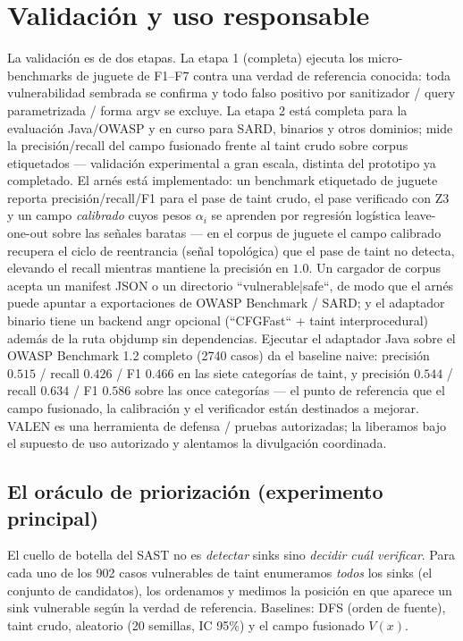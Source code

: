 \documentclass[11pt]{article}
\begin{document}
\section{Validación y uso responsable}
La validación es de dos etapas. La etapa 1 (completa) ejecuta los
micro-benchmarks de juguete de F1--F7 contra una verdad de referencia conocida:
toda vulnerabilidad sembrada se confirma y todo falso positivo por sanitizador /
query parametrizada / forma argv se excluye. La etapa 2 está completa para la evaluación Java/OWASP y en curso para SARD,
binarios y otros dominios; mide la precisión/recall del campo fusionado frente al
taint crudo sobre corpus etiquetados --- validación experimental a gran escala,
distinta del prototipo ya completado. El arnés está implementado: un
benchmark etiquetado de juguete reporta precisión/recall/F1 para el pase de
taint crudo, el pase verificado con Z3 y un campo \emph{calibrado} cuyos pesos
$\alpha_i$ se aprenden por regresión logística leave-one-out sobre las señales
baratas --- en el corpus de juguete el campo calibrado recupera el ciclo de
reentrancia (señal topológica) que el pase de taint no detecta, elevando el
recall mientras mantiene la precisión en $1.0$. Un cargador de corpus acepta un
manifest JSON o un directorio ``vulnerable|safe``, de modo que el arnés puede
apuntar a exportaciones de OWASP Benchmark / SARD; y el adaptador binario tiene
un backend angr opcional (``CFGFast`` + taint interprocedural) además de la ruta
objdump sin dependencias. Ejecutar el adaptador Java sobre el OWASP Benchmark 1.2
completo (2740 casos) da el baseline naive: precisión $0.515$ / recall $0.426$ /
F1 $0.466$ en las siete categorías de taint, y precisión $0.544$ / recall
$0.634$ / F1 $0.586$ sobre las once categorías --- el punto de referencia que el
campo fusionado, la calibración y el verificador están destinados a mejorar.
VALEN es una herramienta de
defensa / pruebas autorizadas; la liberamos bajo el supuesto de uso autorizado y
alentamos la divulgación coordinada.

\subsection{El oráculo de priorización (experimento principal)}
El cuello de botella del SAST no es \emph{detectar} sinks sino \emph{decidir cuál
verificar}. Para cada uno de los 902 casos vulnerables de taint enumeramos
\emph{todos} los sinks (el conjunto de candidatos), los ordenamos y medimos la
posición en que aparece un sink vulnerable según la verdad de referencia.
Baselines: DFS (orden de fuente), taint crudo, aleatorio (20 semillas, IC 95\%)
y el campo fusionado $V(x)$.
\end{document}
